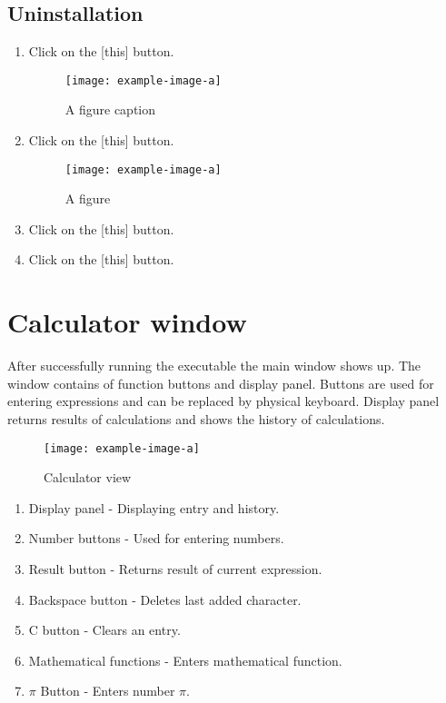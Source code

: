 \documentclass{article}
\begin{document}
\subsection{Uninstallation}

\begin{enumerate}
\item Click on the [this] button.
  \begin{figure}[H]
    \centering
    \texttt{[image: example-image-a]}
    \caption{A figure caption}
  \end{figure}
  
\item Click on the [this] button.
  \begin{figure}[H]
    \centering
    \texttt{[image: example-image-a]}
    \caption{A figure }
  \end{figure}

\item Click on the [this] button.
\item Click on the [this] button.
\end{enumerate}


\section{Calculator window}
After successfully running the executable the main window shows up. The window contains of function buttons and display panel. Buttons are used for entering expressions and can be replaced by physical keyboard. Display panel returns results of calculations and shows the history of calculations.
  \begin{figure}[H]
    \centering
    \texttt{[image: example-image-a]}
  \caption{Calculator view}
\end{figure}

\begin{enumerate}
\item Display panel - Displaying entry and history.
\item Number buttons - Used for entering numbers.
\item Result button - Returns result of current expression.
\item Backspace button - Deletes last added character.
\item C button - Clears an entry.
\item Mathematical functions - Enters mathematical function.
\item $\pi$ Button - Enters number $\pi$.
\end{enumerate}
\end{document}
